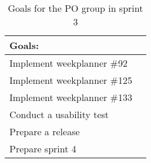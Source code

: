 \begin{table}[H]
    \centering
    \begin{tabular}{|l|l|}
    \hline
    Goals:                                   \\ \hline
    Implement weekplanner \#92               \\ \hline
    Implement weekplanner \#125              \\ \hline
    Implement weekplanner \#133              \\ \hline
    Conduct a usability test                 \\ \hline
    Prepare a release                          \\ \hline
    Prepare sprint 4                         \\ \hline
    \end{tabular}
    \caption{Goals for the PO group in sprint 3}
    \label{PO-goal-sprint-3}
\end{table}
